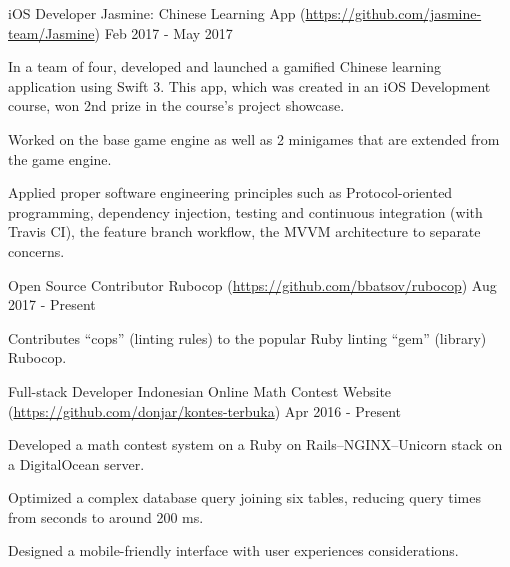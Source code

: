 

\begin{cventries}

  \cventry
  {iOS Developer} %
  {Jasmine: Chinese Learning App (\url{https://github.com/jasmine-team/Jasmine})} %
  {} %
  {Feb 2017 - May 2017} %
  {
    \begin{cvitems} %
    \item {In a team of four, developed and launched a gamified Chinese learning application using Swift 3. This app, which was created in an iOS Development course, won 2nd prize in the course's project showcase.}
    \item {Worked on the base game engine as well as 2 minigames that are extended from the game engine.}
    \item {Applied proper software engineering principles such as Protocol-oriented programming, dependency injection, testing and continuous integration (with Travis CI), the feature branch workflow, the MVVM architecture to separate concerns.}
    \end{cvitems}
  }

  \cventry
  {Open Source Contributor} %
  {Rubocop (\url{https://github.com/bbatsov/rubocop})} %
  {} %
  {Aug 2017 - Present} %
  {
    \begin{cvitems} %
    \item {Contributes ``cops'' (linting rules) to the popular Ruby linting ``gem'' (library) Rubocop.}
    \end{cvitems}
  }

  \cventry
  {Full-stack Developer} %
  {Indonesian Online Math Contest Website (\url{https://github.com/donjar/kontes-terbuka})} %
  {} %
  {Apr 2016 - Present} %
  {
    \begin{cvitems} %
    \item {Developed a math contest system on a Ruby on Rails--NGINX--Unicorn stack on a DigitalOcean server.}
    \item {Optimized a complex database query joining six tables, reducing query times from seconds to around 200 ms.}
    \item {Designed a mobile-friendly interface with user experiences considerations.}
    \end{cvitems}
  }

\end{cventries}
